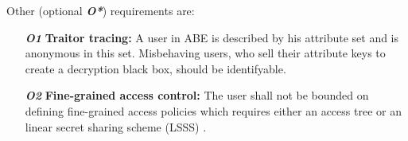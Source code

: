 \noindent Other (optional \textbf{\textit{O*}}) requirements are: 
\begin{itemize}
	\item[\textit{\textbf{O1}}] \textbf{Traitor tracing:} A user in \ac{ABE} is described by his attribute set and is anonymous in this set. Misbehaving users, who sell their attribute keys to create a decryption black box, should be identifyable. \cite{liu2016practical}
	\item[\textit{\textbf{O2}}] \textbf{Fine-grained access control:} The user shall not be bounded on defining fine-grained access policies which requires either an access tree \cite{bethencourt2007ciphertext} or an linear secret sharing scheme (\ac{LSSS}) \cite{yang2013dac} \cite{li2016secure} \cite{wu2017security} \cite{li2013matrix} \cite{liu2016practical}.
\end{itemize}